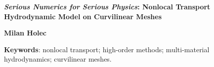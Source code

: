 \documentclass[11pt,a4paper]{article}
\begin{document}
\pagestyle{empty}

\begin{center}
%
%
{\fontsize{14}{20}\bf \textit{Serious Numerics for Serious Physics}:
  Nonlocal Transport Hydrodynamic Model on Curvilinear Meshes}
\end{center}

%
%
\begin{center}
\textbf{Milan Holec}\\
%
%
\end{center}
%
%
{\bf Keywords}: 
  nonlocal transport; 
  high-order methods; 
  multi-material hydrodynamics;
  curvilinear meshes.
\end{document}

